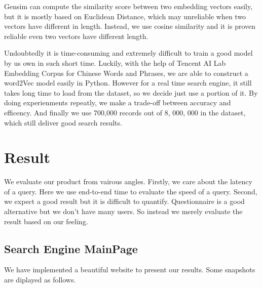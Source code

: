 \documentclass[UTF8]{article}
\begin{document}
	Gensim can compute the similarity score between two embedding vectors easily, but it is mostly based on Euclidean Distance, which may unreliable when two vectors have different in length. Instead, we use cosine similarity and it is proven reliable even two vectors have different length.
	
	Undoubtedly it is time-consuming and extremely difficult to train a good model by us own in such short time. Luckily, with the help of Tencent AI Lab Embedding Corpus for Chinese Words and Phrases, we are able to construct a word2Vec model easily in Python. However for a real time search engine, it still takes long time to load from the dataset, so we decide just use a portion of it. By doing experienments repeatly, we make a trade-off between accuracy and efficency. And finally we use 700,000 records out of 8, 000, 000 in the dataset, which still deliver good search results.
	
	
	\section{Result}
	We evaluate our product from vairous angles. Firstly, we care about the latency of a query. Here we use end-to-end time to evaluate the speed of a query. Second, we expect a good result but it is difficult to quantify. Questionnaire is a good alternative but we don't have many users. So instead we merely evaluate the result based on our feeling. 
	
	\subsection{Search Engine MainPage}
	We have implemented a beautiful website to present our results. Some snapshots are diplayed as follows.
\end{document}
